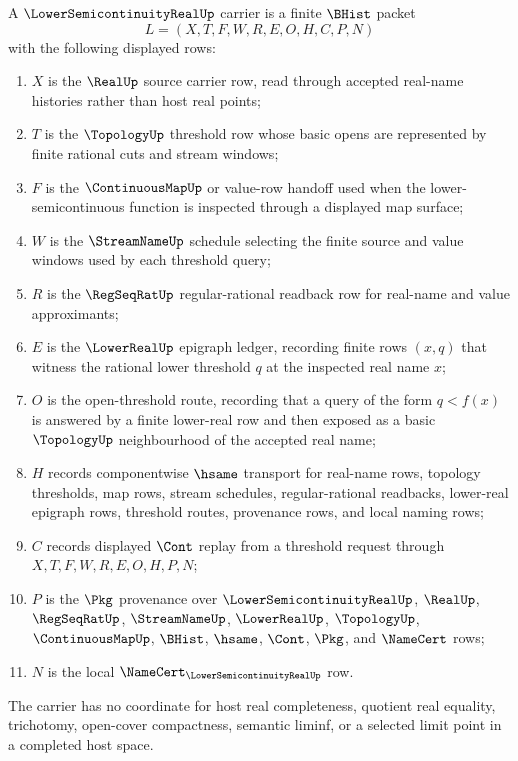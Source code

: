 \begin{definition}
\label{def:lower-semicontinuity-real-carrier}
A $\LowerSemicontinuityRealUp$ carrier is a finite $\BHist$ packet
$$
L=(X,T,F,W,R,E,O,H,C,P,N)
$$
with the following displayed rows:
\begin{enumerate}
\item $X$ is the $\RealUp$ source carrier row, read through accepted real-name
  histories rather than host real points;
\item $T$ is the $\TopologyUp$ threshold row whose basic opens are represented
  by finite rational cuts and stream windows;
\item $F$ is the $\ContinuousMapUp$ or value-row handoff used when the
  lower-semicontinuous function is inspected through a displayed map surface;
\item $W$ is the $\StreamNameUp$ schedule selecting the finite source and value
  windows used by each threshold query;
\item $R$ is the $\RegSeqRatUp$ regular-rational readback row for real-name and
  value approximants;
\item $E$ is the $\LowerRealUp$ epigraph ledger, recording finite rows
  $(x,q)$ that witness the rational lower threshold $q$ at the inspected real
  name $x$;
\item $O$ is the open-threshold route, recording that a query of the form
  $q<f(x)$ is answered by a finite lower-real row and then exposed as a basic
  $\TopologyUp$ neighbourhood of the accepted real name;
\item $H$ records componentwise $\hsame$ transport for real-name rows,
  topology thresholds, map rows, stream schedules, regular-rational readbacks,
  lower-real epigraph rows, threshold routes, provenance rows, and local naming
  rows;
\item $C$ records displayed $\Cont$ replay from a threshold request through
  $X,T,F,W,R,E,O,H,P,N$;
\item $P$ is the $\Pkg$ provenance over $\LowerSemicontinuityRealUp$,
  $\RealUp$, $\RegSeqRatUp$, $\StreamNameUp$, $\LowerRealUp$,
  $\TopologyUp$, $\ContinuousMapUp$, $\BHist$, $\hsame$, $\Cont$, $\Pkg$, and
  $\NameCert$ rows;
\item $N$ is the local $\NameCert_{\LowerSemicontinuityRealUp}$ row.
\end{enumerate}
The carrier has no coordinate for host real completeness, quotient real
equality, trichotomy, open-cover compactness, semantic liminf, or a selected
limit point in a completed host space.
\end{definition}

